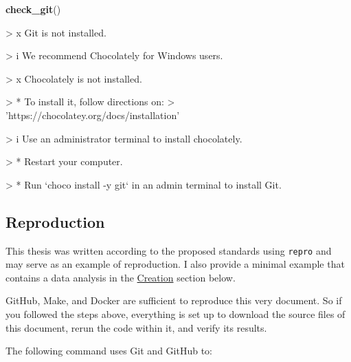 \documentclass[12pt,a4paper,twoside]{article}
\newenvironment{Shaded}{\begin{snugshade}}{\end{snugshade}}
\newcommand{\KeywordTok}[1]{\textcolor[rgb]{0.13,0.29,0.53}{\textbf{#1}}}
\newcommand{\NormalTok}[1]{#1}
\let\oldverbatim\verbatim
\let\endoldverbatim\endverbatim
\renewenvironment{verbatim}{\footnotesize\oldverbatim}{\endoldverbatim}
\begin{document}
\begin{Shaded}
\begin{Highlighting}[]
\KeywordTok{check_git}\NormalTok{()}
\end{Highlighting}
\end{Shaded}

\begin{verbatim}
> x Git is not installed.
\end{verbatim}

\begin{verbatim}
> i We recommend Chocolately for Windows users.
\end{verbatim}

\begin{verbatim}
> x Chocolately is not installed.
\end{verbatim}

\begin{verbatim}
> * To install it, follow directions on:
>   'https://chocolatey.org/docs/installation'
\end{verbatim}

\begin{verbatim}
> i Use an administrator terminal to install chocolately.
\end{verbatim}

\begin{verbatim}
> * Restart your computer.
\end{verbatim}

\begin{verbatim}
> * Run `choco install -y git` in an admin terminal to install Git.
\end{verbatim}

\hypertarget{reproduction}{%
\subsection{Reproduction}\label{reproduction}}

This thesis was written according to the proposed standards using \texttt{repro} and may serve as an example of reproduction.
I also provide a minimal example that contains a data analysis in the \protect\hyperlink{creation}{Creation} section below.

GitHub, Make, and Docker are sufficient to reproduce this very document.
So if you followed the steps above, everything is set up to download the source files of this document, rerun the code within it, and verify its results.

The following command uses Git and GitHub to:
\end{document}
